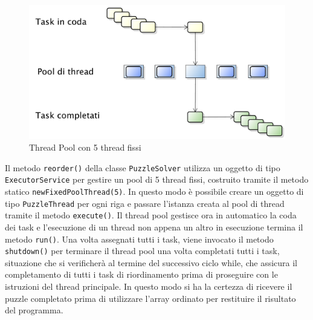 \begin{figure}[htbp]
    \centering
    \centerline{\includegraphics[scale=0.4]{./images/threadpool.pdf}}
    \caption{Thread Pool con 5 thread fissi}
\end{figure}

Il metodo \texttt{reorder()} della classe \texttt{PuzzleSolver} utilizza un oggetto di tipo \texttt{ExecutorService} per gestire un pool di 5 thread fissi, costruito tramite il metodo statico \texttt{newFixedPoolThread(5)}.
In questo modo è possibile creare un oggetto di tipo \texttt{PuzzleThread} per ogni riga e passare l'istanza creata al pool di thread tramite il metodo \texttt{execute()}.
Il thread pool gestisce ora in automatico la coda dei task e l'esecuzione di un thread non appena un altro in esecuzione termina il metodo \texttt{run()}.
Una volta assegnati tutti i task, viene invocato il metodo \texttt{shutdown()} per terminare il thread pool una volta completati tutti i task, situazione che si verificherà al termine del successivo ciclo while,
che assicura il completamento di tutti i task di riordinamento prima di proseguire con le  istruzioni del thread principale. In questo modo si ha la certezza di ricevere il puzzle completato prima di utilizzare
l'array ordinato per restituire il risultato del programma.
